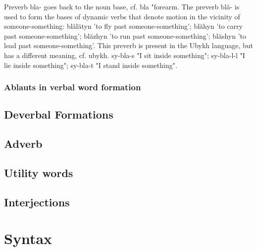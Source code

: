 \documentclass[a4paper,12pt]{book}
\newcommand{\1}[1]{\textbf{\emph{#1}}} %
\newcommand{\2}[1]{\textbf{[#1]}} %
\newcommand{\3}[1]{\fontsize{11pt}{0cm}\textbf{\emph{#1}}} %
\newcommand{\4}[1]{\fontsize{10pt}{0cm}\emph{#1}}	%
\newcommand{\5}[1]{\textbf{/#1/}} %
\newcommand{\6}[1]{\textbf{[#1]}} %
\newcommand{\7}[1]{\fontsize{12pt}{0cm}\emph{#1}} %
\newcommand{\8}[1]{\fontsize{12pt}{0cm}`#1'} %
\newcommand{\9}[1]{\fontsize{12pt}{0cm}(lit. `#1')} %
\begin{document}
Preverb bla- goes back to the noun base, cf. bla "forearm. The preverb blă- is used to form the bases of dynamic verbs that denote motion in the vicinity of someone-something: blălătyn 'to fly past someone-something'; blăhyn 'to carry past someone-something'; blăzhyn 'to run past someone-something'; blăshyn 'to lead past someone-something'.
This preverb is present in the Ubykh language, but has a different meaning, cf. ubykh. sy-bla-s "I sit inside something"; sy-bla-l-l "I lie inside something"; sy-bla-t "I stand inside something".

\subsection{Ablauts in verbal word formation}

\section{Deverbal Formations}
\section{Adverb}
\section{Utility words}
\section{Interjections}
\chapter{Syntax}
\end{document}
